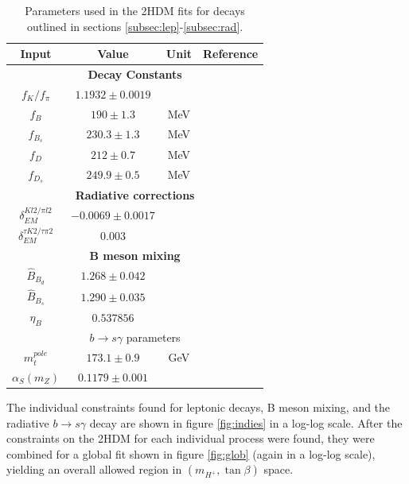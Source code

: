 \documentclass[a4paper,12pt]{article}
\begin{document}
\begin{table}[ht]
    \centering
    \begin{tabular}{c|ccc}
        \hline\hline
        Input & Value & Unit & Reference \\
        \hline\hline
        \multicolumn{4}{c}{\bfseries Decay Constants} \\
        \hline\hline
        $f_K/f_\pi$ & $1.1932\pm0.0019$ & & \cite{d}\\
        $f_B$ & $190\pm1.3$ & MeV & \cite{j} \\
        $f_{B_s}$ & $230.3\pm1.3$ & MeV & \cite{j} \\
        $f_D$ & $212\pm0.7$ & MeV & \cite{j} \\
        $f_{D_s}$ & $249.9\pm0.5$ & MeV & \cite{j} \\
        \hline\hline
        \multicolumn{4}{c}{\bfseries Radiative corrections} \\
        \hline\hline
        $\delta^{Kl2/\pi l2}_{EM}$ & $-0.0069\pm0.0017$ & & \cite{d} \\
        $\delta^{\tau K2/\tau\pi 2}_{EM}$ & $0.003$ & & \cite{a} \\
        \hline\hline
        \multicolumn{4}{c}{\bfseries B meson mixing} \\
        \hline\hline
        $\hat{B}_{B_d}$ & $1.268\pm0.042$ & & \cite{i} \\
        $\hat{B}_{B_s}$ & $1.290\pm0.035$ & & \cite{i} \\
        $\eta_B$ & $0.537856$ & & \cite{k} \\
        \hline\hline
        \multicolumn{4}{c}{$b\to s\gamma$ parameters} \\
        \hline\hline
        $m_t^{pole}$ & $173.1\pm0.9$ & GeV & \cite{d} \\
        $\alpha_S(m_Z)$ & $0.1179\pm0.001$ & & \cite{d} \\
        \hline\hline
    \end{tabular}
    \caption{\label{tab:params} Parameters used in the 2HDM fits for decays outlined in sections \ref{subsec:lep}-\ref{subsec:rad}.}
\end{table}
The individual constraints found for leptonic decays, B meson mixing, and the radiative $b\to s\gamma$ decay are shown in figure \ref{fig:indies} in a log-log scale.
After the constraints on the 2HDM for each individual process were found, they were combined for a global fit shown in figure \ref{fig:glob} (again in a log-log scale), yielding an overall allowed region in $(m_{H^+},\tan\beta)$ space. 
\end{document}
